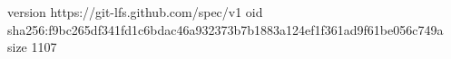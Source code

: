 version https://git-lfs.github.com/spec/v1
oid sha256:f9bc265df341fd1c6bdac46a932373b7b1883a124ef1f361ad9f61be056c749a
size 1107
